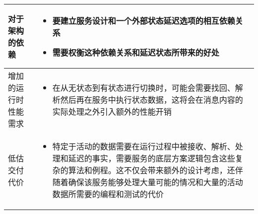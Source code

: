 \begin{longtable}{|m{3cm}<{\centering}|m{12cm}|}
    \hline
    对于架构的依赖
    & 
    \vspace{-1.3em}
    \begin{itemize}[leftmargin=1.5em,itemsep=-3pt,topsep=-3pt]
        \item 要建立服务设计和一个外部状态延迟选项的相互依赖关系
        \item 需要权衡这种依赖关系和延迟状态所带来的好处
    \vspace{-1.5em}
    \end{itemize}  
    \\ \hline
    增加的运行时性能需求
    & 
    \vspace{-1.3em}
    \begin{itemize}[leftmargin=1.5em,itemsep=-3pt,topsep=-3pt]
        \item 在从无状态到有状态进行切换时，可能会需要找回、解析然后再在服务中执行状态数据，这将会在消息内容的实际处理之外引入额外的性能开销
    \vspace{-1.5em}
    \end{itemize}  
    \\ \hline
    低估交付代价
    & 
    \vspace{-1.3em}
    \begin{itemize}[leftmargin=1.5em,itemsep=-3pt,topsep=-3pt]
        \item 特定于活动的数据需要在运行过程中被接收、解析、处理和延迟的事实，需要服务的底层方案逻辑包含这些复杂的算法和例程。这不仅会带来额外的设计考虑，还伴随着确保该服务能够处理大量可能的情况和大量的活动数据所需要的编程和测试的代价
    \vspace{-1.5em}
    \end{itemize}  
    \\ \hline
\end{longtable}
